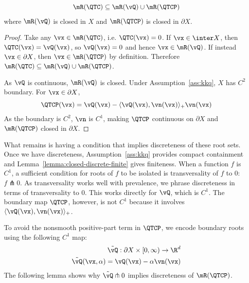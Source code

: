 \begin{lemma}\label{lemma:break-into-two}
	   \[\mR(\QTC) \subseteq \mR(\vQ) \cup \mR(\QTCP)\]
	   where $\mR(\vQ)$ is closed in $X$ and $\mR(\QTCP)$ is closed in $\partial X$.
\end{lemma}
\begin{proof}
Take any $\vx\in \mR(\QTC)$, i.e. $\QTC(\vx)=0$. If $\vx\in \inter X$, then $\QTC(\vx)=\vQ(\vx)$, so $\vQ(\vx)=0$ and hence $\vx\in \mR(\vQ)$. If instead $\vx\in \partial X$, then $\vx\in \mR(\QTCP)$ by definition. Therefore $\mR(\QTC) \subseteq \mR(\vQ) \cup \mR(\QTCP)$.

As $\vQ$ is continuous, $\mR(\vQ)$ is closed. Under Assumption~\ref{ass:kkq}, $X$ has $C^2$ boundary. For $\vx\in\partial X$,
\[\QTCP(\vx) = \vQ(\vx) - \langle \vQ(\vx), \vn(\vx) \rangle_+ \vn(\vx)\]
As the boundary is $C^2$, $\vn$ is $C^1$, making $\QTCP$ continuous on
$\partial X$ and $\mR(\QTCP)$ closed in $\partial X$.
\end{proof}

What remains is having a condition that implies discreteness of these root sets.
Once we have discreteness, Assumption~\ref{ass:kkq} provides compact containment
and Lemma~\ref{lemma:closed-discrete-finite} gives finiteness. When a function
$f$ is $C^1$, a sufficient condition for roots of $f$ to be isolated is
transversality of $f$ to $0$: $f \pitchfork 0$. As transversality works well
with prevalence, we phrase discreteness in terms of transversality to $0$. This
works directly for $\vQ$, which is $C^1$. The boundary map $\QTCP$, however, is
not $C^1$ because it involves $\langle \vQ(\vx), \vn(\vx) \rangle_+$.

To avoid the nonsmooth positive-part term in $\QTCP$, we encode boundary roots
using the following $C^1$ map:
\[
\begin{aligned}
    \tilde{\vQ}:\partial X \times [0,\infty) \to \R^{d} \\
    \tilde{\vQ}(\vx, \alpha) = \vQ(\vx) - \alpha \vn(\vx)
\end{aligned}
 \]
The following lemma shows why $\tilde{\vQ} \pitchfork 0$ implies discreteness of $\mR(\QTCP)$.

